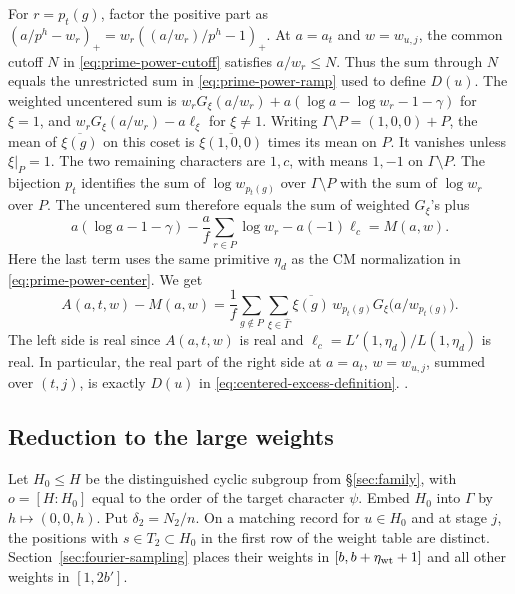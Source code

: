 For \(r=p_t(g)\), factor the positive part as
\((a/p^h-w_r)_+=w_r((a/w_r)/p^h-1)_+\). At \(a=a_t\) and
\(w=w_{u,j}\), the common cutoff \(N\) in \eqref{eq:prime-power-cutoff}
satisfies \(a/w_r\le N\). Thus the sum through \(N\) equals
the unrestricted sum in \eqref{eq:prime-power-ramp} used to define \(D(u)\).
The weighted uncentered sum is
\(w_rG_\xi(a/w_r)+a(\log a-\log w_r-1-\gamma)\) for \(\xi=1\),
and \(w_rG_\xi(a/w_r)-a\ell_\xi\) for \(\xi\ne1\).
Writing \(\Gamma\setminus P=(1,0,0)+P\), the mean of
\(\overline{\xi(g)}\) on this coset is \(\overline{\xi(1,0,0)}\)
times its mean on \(P\). It vanishes unless \(\xi|_P=1\).
The two remaining characters are \(1,c\), with means \(1,-1\)
on \(\Gamma\setminus P\). The bijection \(p_t\) identifies the sum of \(\log
w_{p_t(g)}\) over \(\Gamma\setminus P\) with the sum of \(\log w_r\)
over \(P\). The uncentered sum therefore equals the sum of weighted
\(G_\xi\)'s plus
\[
 a(\log a-1-\gamma)-\frac{a}{f}\sum_{r\in P}\log w_r
       -a(-1)\ell_c=M(a,w).
\]
Here the last term uses the same primitive \(\eta_d\) as the CM
normalization in \eqref{eq:prime-power-center}. We get
\begin{equation}
\label{eq:fourier-balance}
 A(a,t,w)-M(a,w)=\frac{1}{f}\sum_{g\notin P}
   \sum_{\xi\in\widehat\Gamma}\overline{\xi(g)}\,w_{p_t(g)}
                      G_\xi\bigl(a/w_{p_t(g)}\bigr).
\end{equation}
The left side is real since \(A(a,t,w)\) is real and
\(\ell_c=L'(1,\eta_d)/L(1,\eta_d)\) is real. In particular,
the real part of the right side at \(a=a_t\), \(w=w_{u,j}\),
summed over \((t,j)\), is exactly \(D(u)\) in
\eqref{eq:centered-excess-definition}.
.

\subsection{Reduction to the large weights}

Let \(H_0\le H\) be the distinguished cyclic subgroup from
\S\ref{sec:family}, with \(o=[H:H_0]\) equal to the order of the target
character \(\psi\). Embed \(H_0\) into \(\Gamma\) by \(h\mapsto(0,0,h)\).
Put \(\delta_2=N_2/n\). On a matching record for \(u\in H_0\) and at stage \(j\),
the positions with \(s\in T_2\subset H_0\) in the first row of the
weight table are distinct. Section~\ref{sec:fourier-sampling}
places their weights in \([b,b+\eta_{\rm wt}+1]\) and all other
weights in \([1,2b']\).

